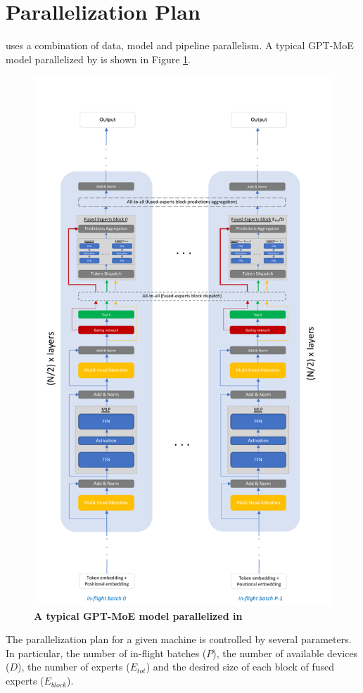 \section{Parallelization Plan}\label{design-parallelization}
\Project uses a combination of data, model and pipeline parallelism. A typical GPT-MoE model parallelized by \Project is shown in Figure \ref{fig:expertflow-gpt-moe}.
\begin{figure}[]
    \centering
    \includegraphics[width=0.9\linewidth]{figures/gpt-moe-illustration.pdf}
    \caption{\textbf{A typical GPT-MoE model parallelized in \Project}}
    \label{fig:expertflow-gpt-moe}
\end{figure}
The parallelization plan for a given machine is controlled by several parameters. In particular, the number of in-flight batches ($P$), the number of available devices ($D$), the number of experts ($E_{tot}$) and the desired size of each block of fused experts ($E_{block}$).

